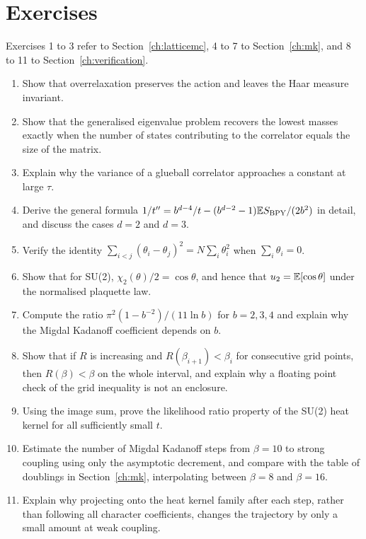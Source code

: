 \section*{Exercises}
Exercises 1 to 3 refer to Section~\ref{ch:latticemc}, 4 to 7 to Section~\ref{ch:mk}, and 8 to 11 to Section~\ref{ch:verification}.
\begin{enumerate}
\item Show that overrelaxation preserves the action and leaves the Haar measure invariant.
\item Show that the generalised eigenvalue problem recovers the lowest masses exactly when the number of states contributing to the correlator equals the size of the matrix.
\item Explain why the variance of a glueball correlator approaches a constant at large $\tau$.
\item Derive the general formula $1/t''=b^{d-4}/t-(b^{d-2}-1)\mathbb{E} S_{\mathrm{BPY}}/(2b^2)$ in detail, and discuss the cases $d=2$ and $d=3$.
\item Verify the identity $\sum_{i<j}(\theta_i-\theta_j)^2=N\sum_i\theta_i^2$ when $\sum_i\theta_i=0$.
\item Show that for SU(2), $\chi_2(\theta)/2=\cos\theta$, and hence that $u_2=\mathbb{E}[\cos\theta]$ under the normalised plaquette law.
\item Compute the ratio $\pi^2(1-b^{-2})/(11\ln b)$ for $b=2,3,4$ and explain why the Migdal Kadanoff coefficient depends on $b$.
\item Show that if $R$ is increasing and $R(\beta_{i+1})<\beta_i$ for consecutive grid points, then $R(\beta)<\beta$ on the whole interval, and explain why a floating point check of the grid inequality is not an enclosure.
\item Using the image sum, prove the likelihood ratio property of the SU(2) heat kernel for all sufficiently small $t$.
\item Estimate the number of Migdal Kadanoff steps from $\beta=10$ to strong coupling using only the asymptotic decrement, and compare with the table of doublings in Section~\ref{ch:mk}, interpolating between $\beta=8$ and $\beta=16$.
\item Explain why projecting onto the heat kernel family after each step, rather than following all character coefficients, changes the trajectory by only a small amount at weak coupling.
\end{enumerate}
